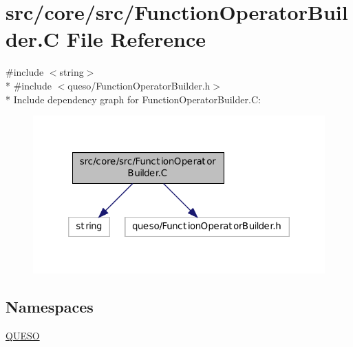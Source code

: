 \hypertarget{_function_operator_builder_8_c}{\section{src/core/src/\-Function\-Operator\-Builder.C File Reference}
\label{_function_operator_builder_8_c}
}
{\ttfamily \#include $<$string$>$}\\*
{\ttfamily \#include $<$queso/\-Function\-Operator\-Builder.\-h$>$}\\*
Include dependency graph for Function\-Operator\-Builder.\-C\-:
\nopagebreak
\begin{figure}[H]
\begin{center}
\leavevmode
\includegraphics[width=322pt]{_function_operator_builder_8_c__incl}
\end{center}
\end{figure}
\subsection*{Namespaces}
\begin{DoxyCompactItemize}
\item 
\hyperlink{namespace_q_u_e_s_o}{Q\-U\-E\-S\-O}
\end{DoxyCompactItemize}
